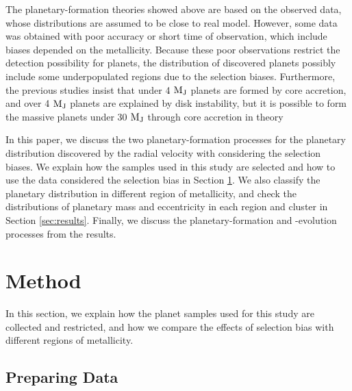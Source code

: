 \documentclass[twocolumn, dvipdfmx]{aastex62}
\begin{document}
\begin{CJK*}{UTF8}{min}
The planetary-formation theories showed above are based on the observed data, whose distributions are assumed to be close to real model. However, some data was obtained with poor accuracy or short time of observation, which include biases depended on the metallicity. Because these poor observations restrict the detection possibility for planets, the distribution of discovered planets possibly include some underpopulated regions due to the selection biases. Furthermore, the previous studies insist that under 4 $\rm M_J$ planets are formed by core accretion, and over 4 $\rm M_J$ planets are explained by disk instability, but it is possible to form the massive planets under 30 $\rm M_J$ through core accretion in theory \citep[e.g.,][]{2009A&A...501.1161M, 2016ApJ...823...48T}

In this paper, we discuss the two planetary-formation processes for the planetary distribution discovered by the radial velocity with considering the selection biases. We explain how the samples used in this study are selected and how to use the data considered the selection bias in Section \ref{sec:method}. We also classify the planetary distribution in different region of metallicity, and check the distributions of planetary mass and eccentricity in each region and cluster in Section \ref{sec:results}. Finally, we discuss the planetary-formation and -evolution processes from the results.


\section{Method} \label{sec:method}

In this section, we explain how the planet samples used for this study are collected and restricted, and how we compare the effects of selection bias with different regions of metallicity.


\subsection{Preparing Data} \label{subsec:prepare}


\end{CJK*}
\end{document}

